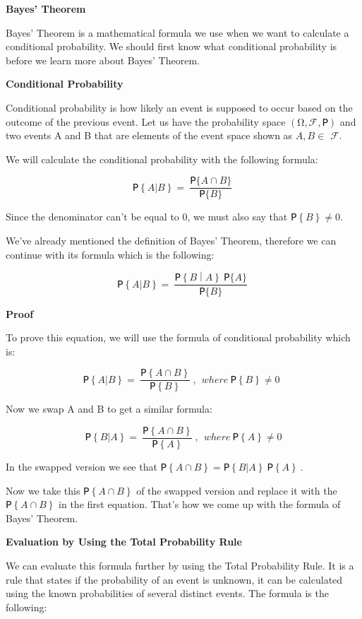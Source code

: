 \documentclass[
]{article}
\author{}
\date{}
\begin{document}
\textbf{Bayes' Theorem}

Bayes' Theorem is a mathematical formula we use when we want to
calculate a conditional probability. We should first know what
conditional probability is before we learn more about Bayes' Theorem.

\textbf{Conditional Probability}

Conditional probability is how likely an event is supposed to occur
based on the outcome of the previous event. Let us have the probability
space \((\mathrm{\Omega},\mathcal{F,}ꓑ)\) and two events A and B that
are elements of the event space shown as
\(A,B \in \mathcal{\text{\ F}}\).

We will calculate the conditional probability with the following
formula:

\[ꓑ\left\{ A|B \right\} = \ \frac{ꓑ\{ A \cap B\}}{ꓑ\{ B\}}\ \]

Since the denominator can't be equal to 0, we must also say that
\(ꓑ\left\{ B \right\} \neq 0\).

We've already mentioned the definition of Bayes' Theorem, therefore we
can continue with its formula which is the following:

\[ꓑ\left\{ A|B \right\} = \ \frac{ꓑ\left\{ B \middle| A \right\}\ ꓑ\{ A\}}{ꓑ\{ B\}}\ \]

\textbf{Proof}

To prove this equation, we will use the formula of conditional
probability which is:

\[ꓑ\left\{ A|B \right\} = \ \frac{ꓑ\left\{ A \cap B \right\}}{ꓑ\left\{ B \right\}}\ ,\ \ where\ ꓑ\left\{ B \right\} \neq 0\ \ \]

Now we swap A and B to get a similar formula:

\[ꓑ\left\{ B|A \right\} = \ \frac{ꓑ\left\{ A \cap B \right\}}{ꓑ\left\{ A \right\}}\ ,\ \ where\ ꓑ\left\{ A \right\} \neq 0\]

In the swapped version we see that
\(ꓑ\left\{ A \cap B \right\} = ꓑ\left\{ B|A \right\}\ ꓑ\left\{ A \right\}\ \).

Now we take this \(ꓑ\left\{ A \cap B \right\}\) of the swapped version
and replace it with the \(ꓑ\left\{ A \cap B \right\}\) in the first
equation. That's how we come up with the formula of Bayes' Theorem.

\textbf{Evaluation by Using the Total Probability Rule}

We can evaluate this formula further by using the Total Probability
Rule. It is a rule that states if the probability of an event is
unknown, it can be calculated using the known probabilities of several
distinct events. The formula is the following:
\end{document}
